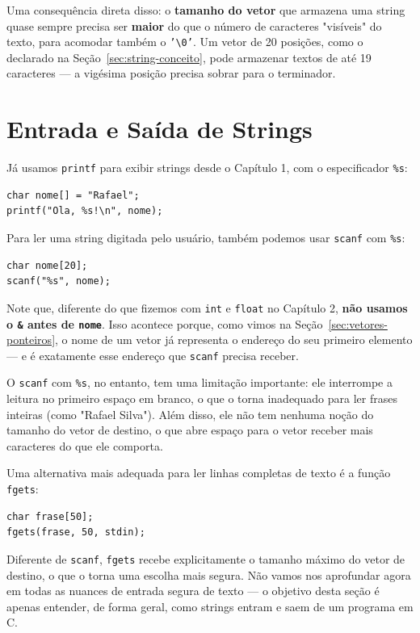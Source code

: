 Uma consequência direta disso: o \textbf{tamanho do vetor} que armazena uma string quase sempre precisa ser \textbf{maior} do que o número de caracteres "visíveis" do texto, para acomodar também o \texttt{'\textbackslash 0'}. Um vetor de 20 posições, como o declarado na Seção~\ref{sec:string-conceito}, pode armazenar textos de até 19 caracteres — a vigésima posição precisa sobrar para o terminador.

\section{Entrada e Saída de Strings}

Já usamos \texttt{printf} para exibir strings desde o Capítulo 1, com o especificador \texttt{\%s}:

\begin{lstlisting}
char nome[] = "Rafael";
printf("Ola, %s!\n", nome);
\end{lstlisting}

Para ler uma string digitada pelo usuário, também podemos usar \texttt{scanf} com \texttt{\%s}:

\begin{lstlisting}
char nome[20];
scanf("%s", nome);
\end{lstlisting}

Note que, diferente do que fizemos com \texttt{int} e \texttt{float} no Capítulo 2, \textbf{não usamos o \texttt{\&} antes de \texttt{nome}}. Isso acontece porque, como vimos na Seção~\ref{sec:vetores-ponteiros}, o nome de um vetor já representa o endereço do seu primeiro elemento — e é exatamente esse endereço que \texttt{scanf} precisa receber.

O \texttt{scanf} com \texttt{\%s}, no entanto, tem uma limitação importante: ele interrompe a leitura no primeiro espaço em branco, o que o torna inadequado para ler frases inteiras (como "Rafael Silva"). Além disso, ele não tem nenhuma noção do tamanho do vetor de destino, o que abre espaço para o vetor receber mais caracteres do que ele comporta.

Uma alternativa mais adequada para ler linhas completas de texto é a função \texttt{fgets}:

\begin{lstlisting}
char frase[50];
fgets(frase, 50, stdin);
\end{lstlisting}

Diferente de \texttt{scanf}, \texttt{fgets} recebe explicitamente o tamanho máximo do vetor de destino, o que o torna uma escolha mais segura. Não vamos nos aprofundar agora em todas as nuances de entrada segura de texto — o objetivo desta seção é apenas entender, de forma geral, como strings entram e saem de um programa em C.

